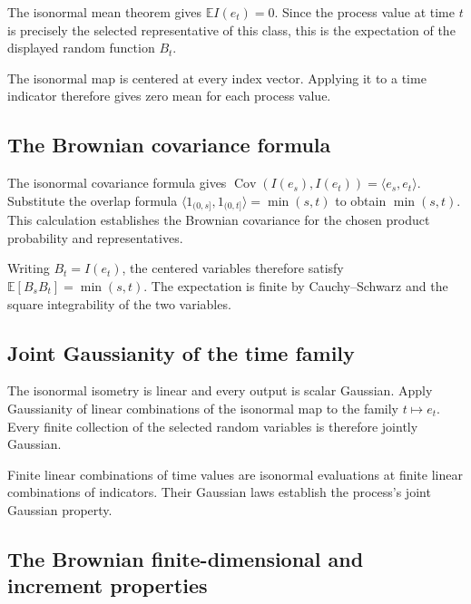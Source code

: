 \documentclass[11pt,a4paper]{report}
\begin{document}
The isonormal mean theorem gives \(\mathbb EI(e_t)=0\). Since the process value at time \(t\) is precisely the selected representative of this class, this is the expectation of the displayed random function \(B_t\).



The isonormal map is centered at every index vector. Applying it to a time indicator therefore gives zero mean for each process value.

\subsection{\texorpdfstring{The Brownian covariance formula}{The Brownian covariance formula}}
\label{report-step-UnadjustedLangevin-CanonicalBrownian-lean-13}


The isonormal covariance formula gives \(\operatorname{Cov}(I(e_s),I(e_t))=\langle e_s,e_t\rangle\). Substitute the overlap formula \(\langle1_{(0,s]},1_{(0,t]}\rangle=\min(s,t)\) to obtain \(\min(s,t)\). This calculation establishes the Brownian covariance for the chosen product probability and representatives.



Writing \(B_t=I(e_t)\), the centered variables therefore satisfy \(\mathbb E[B_sB_t]=\min(s,t)\). The expectation is finite by Cauchy–Schwarz and the square integrability of the two variables.

\subsection{\texorpdfstring{Joint Gaussianity of the time family}{Joint Gaussianity of the time family}}
\label{report-step-UnadjustedLangevin-CanonicalBrownian-lean-14}


The isonormal isometry is linear and every output is scalar Gaussian. Apply Gaussianity of linear combinations of the isonormal map to the family \(t\mapsto e_t\). Every finite collection of the selected random variables is therefore jointly Gaussian.



Finite linear combinations of time values are isonormal evaluations at finite linear combinations of indicators. Their Gaussian laws establish the process's joint Gaussian property.

\subsection{\texorpdfstring{The Brownian finite-dimensional and increment properties}{The Brownian finite-dimensional and increment properties}}
\label{report-step-UnadjustedLangevin-CanonicalBrownian-lean-15}
\end{document}
